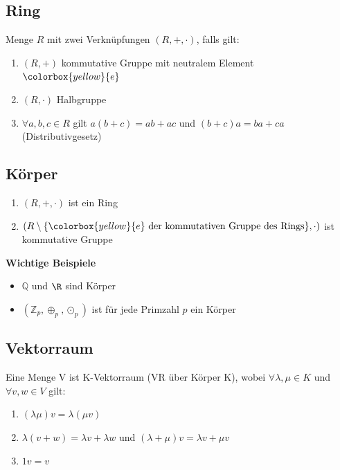 \documentclass[german, fourcolumn, 8pt]{latex4ei/latex4ei_sheet}
\begin{document}
\begin{sectionbox}
    \subsection{Ring}
    Menge $R$ mit zwei Verknüpfungen $(R, +, \cdot)$, falls gilt:
    \begin{enumerate}
        \item $(R, +)$ kommutative Gruppe mit neutralem Element $\colorbox{yellow}{e}$
        \item $(R, \cdot)$ Halbgruppe
        \item $\forall a,b,c \in R$ gilt $a(b+c)=ab+ac$ und $(b+c)a=ba+ca$ (Distributivgesetz)
    \end{enumerate}
\end{sectionbox}

\begin{sectionbox}
    \subsection{Körper}
    \begin{enumerate}
        \item $(R, +, \cdot)$ ist ein Ring
        \item $(R\setminus \{\colorbox{yellow}{e}\text{ der kommutativen Gruppe des Rings}\}, \cdot)$ ist kommutative Gruppe
    \end{enumerate}

    \textbf{Wichtige Beispiele}
    \begin{itemize}
        \item $\mathbb{Q}$ und $\R$ sind Körper
        \item $(\mathbb{Z}_p, \oplus_p, \odot_p)$ ist für jede Primzahl $p$ ein Körper
    \end{itemize}
\end{sectionbox}

\begin{sectionbox}
    \subsection{Vektorraum}
    Eine Menge V ist K-Vektorraum (VR über Körper K), wobei $\forall \lambda, \mu \in K$ und $\forall v,w \in V$ gilt:
    \begin{enumerate}
        \item $(\lambda \mu)v=\lambda(\mu v)$
        \item $\lambda(v+w)=\lambda v + \lambda w$ und $(\lambda + \mu)v=\lambda v + \mu v$
        \item $1v = v$
    \end{enumerate}
\end{sectionbox}
\end{document}
